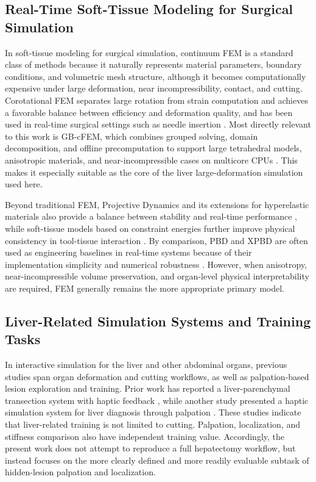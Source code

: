 \documentclass{ieeeaccess}
\begin{document}
\subsection{Real-Time Soft-Tissue Modeling for Surgical Simulation}
In soft-tissue modeling for surgical simulation, continuum FEM is a standard class of methods because it naturally represents material parameters, boundary conditions, and volumetric mesh structure, although it becomes computationally expensive under large deformation, near incompressibility, contact, and cutting. Corotational FEM separates large rotation from strain computation and achieves a favorable balance between efficiency and deformation quality, and has been used in real-time surgical settings such as needle insertion \cite{bui2019corotational}. Most directly relevant to this work is GB-cFEM, which combines grouped solving, domain decomposition, and offline precomputation to support large tetrahedral models, anisotropic materials, and near-incompressible cases on multicore CPUs \cite{wang2025group}. This makes it especially suitable as the core of the liver large-deformation simulation used here.

Beyond traditional FEM, Projective Dynamics and its extensions for hyperelastic materials also provide a balance between stability and real-time performance \cite{bouaziz2023projective,liu2016towards}, while soft-tissue models based on constraint energies further improve physical consistency in tool-tissue interaction \cite{hou2019new}. By comparison, PBD and XPBD are often used as engineering baselines in real-time systems because of their implementation simplicity and numerical robustness \cite{bender2014survey,muller2007position,macklin2016xpbd}. However, when anisotropy, near-incompressible volume preservation, and organ-level physical interpretability are required, FEM generally remains the more appropriate primary model.

\subsection{Liver-Related Simulation Systems and Training Tasks}
In interactive simulation for the liver and other abdominal organs, previous studies span organ deformation and cutting workflows, as well as palpation-based lesion exploration and training. Prior work has reported a liver-parenchymal transection system with haptic feedback \cite{hongyu2021interactive}, while another study presented a haptic simulation system for liver diagnosis through palpation \cite{westwood2012haptic}. These studies indicate that liver-related training is not limited to cutting. Palpation, localization, and stiffness comparison also have independent training value. Accordingly, the present work does not attempt to reproduce a full hepatectomy workflow, but instead focuses on the more clearly defined and more readily evaluable subtask of hidden-lesion palpation and localization.
\end{document}
